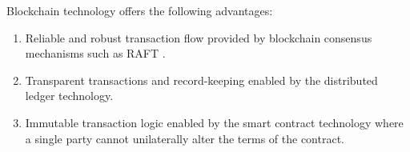 

Blockchain technology offers the following advantages:
\begin{enumerate}
    \item Reliable and robust transaction flow provided by blockchain consensus mechanisms such as RAFT \cite{Ongaro:raft}.
    \item Transparent transactions and record-keeping enabled by the distributed ledger technology.
    \item Immutable transaction logic enabled by the smart contract technology where  a single party cannot unilaterally alter the terms of the contract.
\end{enumerate}


